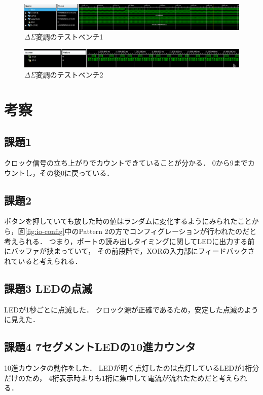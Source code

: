\begin{figure}[tbp]
  \includegraphics[angle=0,width=160mm]{week4/pics/deltasigma-sim.png}
  \centering
  \caption{$\Delta\Sigma$変調のテストベンチ1} %
  \label{fig:deltasigma-testbench1} %
\end{figure}
\begin{figure}[tbp]
  \includegraphics[angle=0,width=160mm]{week4/pics/deltasigma-waveform.png}
  \centering
  \caption{$\Delta\Sigma$変調のテストベンチ2} %
  \label{fig:deltasigma-testbench2} %
\end{figure}

\section{考察}
\subsection{課題1}
クロック信号の立ち上がりでカウントできていることが分かる．
0から9までカウントし，その後0に戻っている．

\subsection{課題2}
ボタンを押していても放した時の値はランダムに変化するようにみられたことから，図\ref{fig:io-config}中のPattern 2の方でコンフィグレーションが行われたのだと考えられる．
つまり，ポートの読み出しタイミングに関してLEDに出力する前にバッファが挟まっていて，
その前段階で，XORの入力部にフィードバックされていると考えられる．

\subsection{課題3 LEDの点滅}
LEDが1秒ごとに点滅した．
クロック源が正確であるため，安定した点滅のように見えた．

\subsection{課題4 7セグメントLEDの10進カウンタ}
10進カウンタの動作をした．
LEDが明く点灯したのは点灯しているLEDが1桁分だけのため，
4桁表示時よりも1桁に集中して電流が流れたためだと考えられる．

